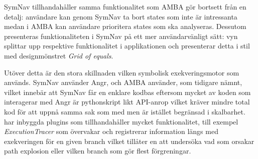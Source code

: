 SymNav tillhandahåller samma funktionalitet som AMBA gör bortsett från en
detalj: användare kan genom SymNav ta bort states som inte är intressanta medan
i AMBA kan användare prioritera states som ska analyseras. Dessutom presenteras
funktionaliteten i SymNav på ett mer användarvänligt sätt: vyn splittar upp
respektive funktionalitet i applikationen och presenterar detta i stil med
designmönstret \emph{Grid of equals}.

Utöver detta är den stora skillnaden vilken symbolisk exekveringsmotor som
används. SymNav använder Angr, och AMBA använder, som tidigare nämnt, \stoe{}
vilket innebär att SymNav får en enklare kodbas eftersom mycket av koden som
interagerar med Angr är pythonskript likt API-anrop vilket kräver mindre total
kod för att uppnå samma sak som med \stoe{} men är istället begränsad i
skalbarhet. \stoe{} har inbyggda plugins som tillhandahåller mycket
funktionalitet, till exempel \emph{ExecutionTracer} som övervakar och
registrerar information längs med exekveringen för en given branch vilket
tillåter en att undersöka vad som orsakar path explosion eller vilken branch som
gör flest förgreningar.
